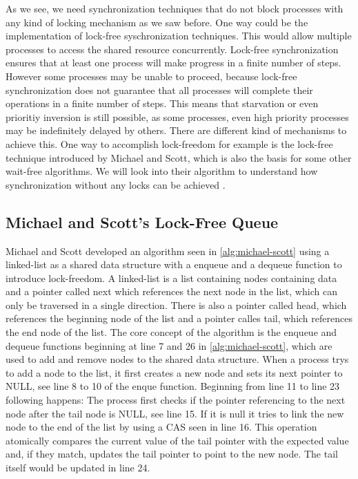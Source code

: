 As we see, we need synchronization techniques that do not block processes with any kind of locking mechanism as we saw before. One way could be the implementation of lock-free syschronization techniques. This would allow multiple processes to access the shared resource concurrently. Lock-free synchronization ensures that at least one process will make progress in a finite number of steps. However some processes may be unable to proceed, because lock-free synchronization does not guarantee that all processes will complete their operations in a finite number of steps. This means that starvation or even prioritiy inversion is still possible, as some processes, even high priority processes may be indefinitely delayed by others. There are different kind of mechanisms to achieve this. One way to accomplish lock-freedom for example is the lock-free technique introduced by Michael and Scott, which is also the basis for some other wait-free algorithms. We will look into their algorithm to understand how synchronization without any locks can be achieved .\cite{MichaelScottQueue,kogan2012methodology}

\subsection{Michael and Scott's Lock-Free Queue}\label{subsec:michael-scott}

Michael and Scott developed an algorithm seen in \cref{alg:michael-scott} using a linked-list as a shared data structure with a enqueue and a dequeue function to introduce lock-freedom. A linked-list is a list containing nodes containing data and a pointer called next which references the next node in the list, which can only be traversed in a single direction. There is also a pointer called head, which references the beginning node of the list and a pointer calles tail, which references the end node of the list. The core concept of the algorithm is the enqueue and dequeue functions beginning at line 7 and 26 in \cref{alg:michael-scott}, which are used to add and remove nodes to the shared data structure. When a process trys to add a node to the list, it first creates a new node and sets its next pointer to NULL, see line 8 to 10 of the enque function. Beginning from line 11 to line 23 following happens: The process first checks if the pointer referencing to the next node after the tail node is NULL, see line 15. If it is null it tries to link the new node to the end of the list by using a \ac{CAS} seen in line 16. This operation atomically compares the current value of the tail pointer with the expected value and, if they match, updates the tail pointer to point to the new node. The tail itself would be updated in line 24.  \cite{MichaelScottQueue}

